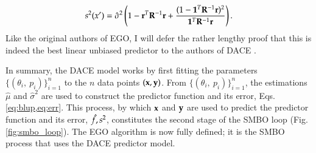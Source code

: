 \begin{equation}\label{eq:err}
s^2(x') = \hat{\sigma}^2 \left(1 - \mathbf{r}^T\mathbf{R}^{-1}\mathbf{r} + \frac{(1 - \mathbf{1}^T\mathbf{R}^{-1}\mathbf{r})^2}{\mathbf{1}^T\mathbf{R}^{-1}\mathbf{r}} \right).
\end{equation}
Like the original authors of EGO, I will defer the rather lengthy proof that this is indeed the best linear unbiased predictor to the authors of DACE \cite{jones_efficient_1998,sacks_design_1989}.

In summary, the DACE model works by first fitting the parameters $\{(\theta_i,\ p_i)\}_{i=1}^n$ to the $n$ data points $(\mathbf{x},\mathbf{y})$. From $\{(\theta_i,\ p_i)\}_{i=1}^n$, the estimations $\hat{\mu}$ and $\hat{\sigma}^2$ are used to construct the predictor function and its error, Eqs. \ref{eq:blup,eq:err}. This process, by which $\mathbf{x}$ and $\mathbf{y}$ are used to predict the predictor function and its error, $\hat{f},s^2$, constitutes the second stage of the SMBO loop (Fig. \ref{fig:smbo_loop}). The EGO algorithm is now fully defined; it is the SMBO process that uses the DACE predictor model.
